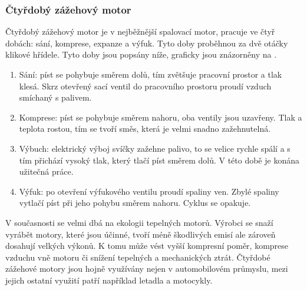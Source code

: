 \newpage

\subsubsection{Čtyřdobý zážehový motor}
{Čtyřdobý zážehový motor je v nejběžnější spalovací motor, pracuje ve čtyř dobách: sání, komprese, expanze a výfuk. Tyto doby proběhnou za dvě otáčky klikové hřídele. Tyto doby jsou popsány níže, graficky jsou znázorněny na .}
\cite{ZUP:CtyrdobyAtmosferickyZazehovyMotor}
\begin{enumerate}
    \item {Sání: píst se pohybuje směrem dolů, tím zvětšuje pracovní prostor a tlak klesá. Skrz otevřený sací ventil do pracovního prostoru proudí vzduch smíchaný s palivem.}
    \item {Komprese: píst se pohybuje směrem nahoru, oba ventily jsou uzavřeny. Tlak a teplota rostou, tím se tvoří směs, která je velmi snadno zažehnutelná.}
    \item {Výbuch: elektrický výboj svíčky zažehne palivo, to se velice rychle spálí a s tím přichází vysoký tlak, který tlačí píst směrem dolů. V této době je konána užitečná práce.}
    \item {Výfuk: po otevření výfukového ventilu proudí spaliny ven. Zbylé spaliny vytlačí píst při jeho pohybu směrem nahoru. Cyklus se opakuje.}
\end{enumerate}
{V současnosti se velmi dbá na ekologii tepelných motorů. Výrobci se snaží vyrábět motory, které jsou účinné, tvoří méně škodlivých emisí ale zároveň dosahují velkých výkonů. K tomu může vést vyšší kompresní poměr, komprese vzduchu vně motoru či snížení tepelných a mechanických ztrát.}
\cite{ZUP:CtyrdobyAtmosferickyZazehovyMotor}\odst
{Čtyřdobé zážehové motory jsou hojně využívány nejen v automobilovém průmyslu, mezi jejich ostatní využití patří například letadla a motocykly.}

